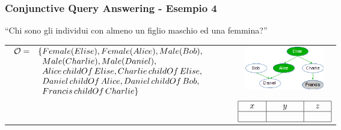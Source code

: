 \documentclass[8pt]{beamer}
\begin{document}
\begin{frame}
\frametitle{Conjunctive Query Answering - Esempio 4}
\begin{center}
``Chi sono gli individui con almeno un figlio maschio ed una femmina?''
\end{center}

\begin{tabular}{lc}
$\begin{array}{cl}
  \Ont  =  &  \{Female(Elise),  Female(Alice), Male(Bob), \\
  &\phantom{\{}Male(Charlie), Male(Daniel), \\
  &\phantom{\{}Alice\,childOf\,Elise, Charlie\,childOf\,Elise, \\
  &\phantom{\{}Daniel\,childOf\,Alice, Daniel\,childOf\,Bob, \\
  &\phantom{\{}Francis\,childOf\,Charlie \}\\
\end{array}$ & \includegraphics[width=130px]{family.png} \\
$\phantom{Q=y\,childOf\,x\,\wedge\,z\,childOf\,x\,\wedge\,Male(y)\,\wedge\,Female(z)}$ &
$\begin{array}{|c|c|c|}
  \hline
  x&y&z\\
  \hline
  \phantom{Elise}&\phantom{Charlie}&\phantom{Alice}\\
  \hline
\end{array}$ \\
\end{tabular}
\end{frame}
\end{document}
